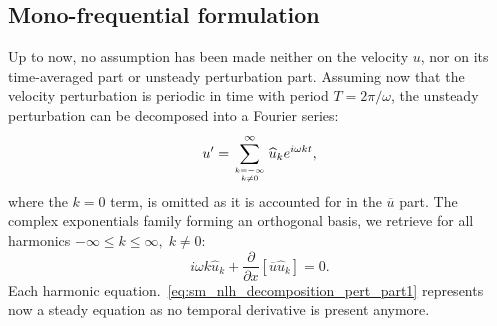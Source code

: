 \subsection{Mono-frequential formulation}
Up to now, no assumption has been made neither on the velocity $u$,
nor on its time-averaged part or unsteady perturbation part.
Assuming now that the velocity perturbation 
is periodic in time with period
$T=2 \pi / \omega$,
the unsteady perturbation can be decomposed into 
a Fourier series:
\begin{equation}
	u^\prime = \sum_{\genfrac{}{}{0pt}{}{k=-\infty}{k \neq 0}}^{\infty} 
	\widehat{u}_k e^{i \omega k t},
	\label{eq:sm_nlh_decomposition_pert}
\end{equation}
where the $k=0$ term, is omitted as it is accounted for in
the $\overline{u}$ part.
The complex exponentials family forming
an orthogonal basis, we retrieve for all harmonics 
$-\infty \leq k \leq \infty, \; k \neq 0$:
\begin{equation}
	i \omega k \widehat{u}_k + 
	\frac{\partial}{\partial x} \left[ \overline{u} \widehat{u}_k\right] =
	0.
	\label{eq:sm_nlh_decomposition_pert_part1}
\end{equation}
Each harmonic equation.~\eqref{eq:sm_nlh_decomposition_pert_part1}
represents now a steady equation as no temporal
derivative is present anymore.

